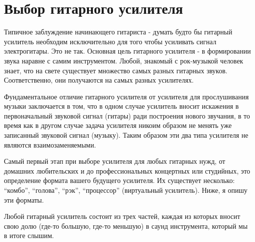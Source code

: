 \section{Выбор гитарного усилителя}
Типичное заблуждение начинающего гитариста - думать будто бы гитарный усилитель необходим исключительно для того чтобы усиливать сигнал электрогитары. Это не так. Основная цель гитарного усилителя - в формировании звука наравне с самим инструментом. Любой, знакомый с рок-музыкой человек знает, что на свете существует множество самых разных гитарных звуков. Соответственно, они получаются на самых разных усилителях.

Фундаментальное отличие гитарного усилителя от усилителя для прослушивания музыки заключается в том, что в одном случае усилитель вносит искажения в первоначальный звуковой сигнал (гитары) ради построения нового звучания, в то время как в другом случае задача усилителя никоим образом не менять уже записанный звуковой сигнал (музыку). Таким образом эти два типа усилителя не являются взаимозаменяемыми.

Самый первый этап при выборе усилителя для любых гитарных нужд, от домашних любительских и до профессиональных концертных или студийных, это определение формата вашего будущего усилителя. Их существует несколько: “комбо”, “голова”, “рэк”, “процессор” (виртуальный усилитель). Ниже, я опишу эти форматы.

Любой гитарный усилитель состоит из трех частей, каждая из которых вносит свою долю (где-то большую, где-то меньшую) в саунд инструмента, который мы в итоге слышим.

